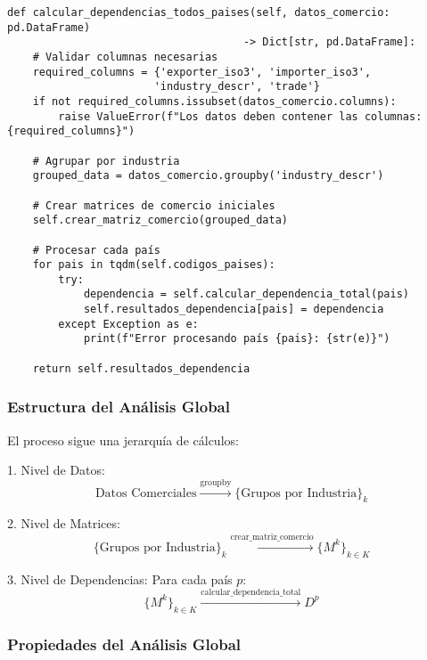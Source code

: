 \documentclass[11pt,a4paper]{article}
\begin{document}
\begin{tcolorbox}[colback=codebackground,title=Implementación del Método]
\begin{lstlisting}
def calcular_dependencias_todos_paises(self, datos_comercio: pd.DataFrame) 
                                     -> Dict[str, pd.DataFrame]:
    # Validar columnas necesarias
    required_columns = {'exporter_iso3', 'importer_iso3', 
                       'industry_descr', 'trade'}
    if not required_columns.issubset(datos_comercio.columns):
        raise ValueError(f"Los datos deben contener las columnas: {required_columns}")
    
    # Agrupar por industria
    grouped_data = datos_comercio.groupby('industry_descr')
    
    # Crear matrices de comercio iniciales
    self.crear_matriz_comercio(grouped_data)
    
    # Procesar cada país
    for pais in tqdm(self.codigos_paises):
        try:
            dependencia = self.calcular_dependencia_total(pais)
            self.resultados_dependencia[pais] = dependencia
        except Exception as e:
            print(f"Error procesando país {pais}: {str(e)}")
    
    return self.resultados_dependencia
\end{lstlisting}
\end{tcolorbox}

\subsubsection{Estructura del Análisis Global}

El proceso sigue una jerarquía de cálculos:

1. Nivel de Datos:
\begin{equation}
\text{Datos Comerciales} \xrightarrow{\text{groupby}} \{\text{Grupos por Industria}\}_k
\end{equation}

2. Nivel de Matrices:
\begin{equation}
\{\text{Grupos por Industria}\}_k \xrightarrow{\text{crear\_matriz\_comercio}} \{M^k\}_{k \in K}
\end{equation}

3. Nivel de Dependencias:
Para cada país $p$:
\begin{equation}
\{M^k\}_{k \in K} \xrightarrow{\text{calcular\_dependencia\_total}} D^p
\end{equation}

\subsubsection{Propiedades del Análisis Global}
\end{document}
